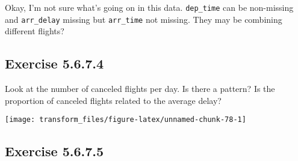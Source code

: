 \documentclass[]{book}
\newenvironment{Shaded}{\begin{snugshade}}{\end{snugshade}}
\newcommand{\CommentTok}[1]{\textcolor[rgb]{0.56,0.35,0.01}{\textit{#1}}}
\newcommand{\DataTypeTok}[1]{\textcolor[rgb]{0.13,0.29,0.53}{#1}}
\newcommand{\KeywordTok}[1]{\textcolor[rgb]{0.13,0.29,0.53}{\textbf{#1}}}
\newcommand{\NormalTok}[1]{#1}
\newcommand{\OperatorTok}[1]{\textcolor[rgb]{0.81,0.36,0.00}{\textbf{#1}}}
\newcommand{\OtherTok}[1]{\textcolor[rgb]{0.56,0.35,0.01}{#1}}
\newcommand{\StringTok}[1]{\textcolor[rgb]{0.31,0.60,0.02}{#1}}
\theoremstyle{plain}
\theoremstyle{remark}
\begin{document}
Okay, I'm not sure what's going on in this data. \texttt{dep\_time} can
be non-missing and \texttt{arr\_delay} missing but \texttt{arr\_time}
not missing. They may be combining different flights?

\hypertarget{exercise-5.6.7.4}{%
\subsection*{\texorpdfstring{Exercise
{5.6.7.4}}{Exercise 5.6.7.4}}\label{exercise-5.6.7.4}}

Look at the number of canceled flights per day. Is there a pattern? Is
the proportion of canceled flights related to the average delay?

\begin{Shaded}
\end{Shaded}

\begin{center}\texttt{[image: transform\_files/figure-latex/unnamed-chunk-78-1]} \end{center}

\hypertarget{exercise-5.6.7.5}{%
\subsection*{\texorpdfstring{Exercise
{5.6.7.5}}{Exercise 5.6.7.5}}\label{exercise-5.6.7.5}}
\end{document}
